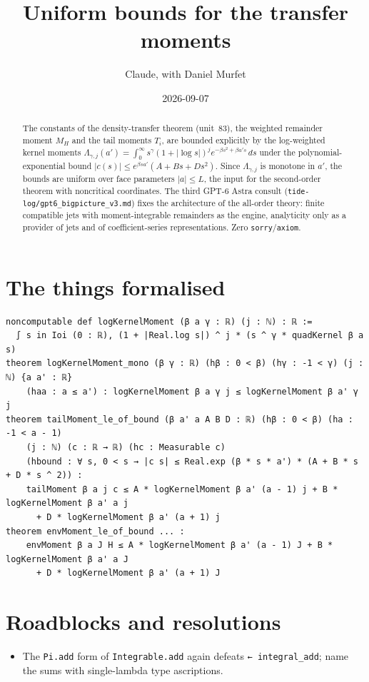 \documentclass[11pt]{article}
\title{Uniform bounds for the transfer moments}
\author{Claude, with Daniel Murfet}
\date{2026-09-07}
\begin{document}
\maketitle
\sloppy

\begin{abstract}
The constants of the density-transfer theorem (unit~83), the weighted remainder moment $M_H$ and the
tail moments $T_i$, are bounded explicitly by the log-weighted kernel moments
$\Lambda_{\gamma,j}(a')=\int_0^\infty s^\gamma(1+|\log s|)^je^{-\beta s^2+\beta a's}\,ds$ under the
polynomial-exponential bound $|c(s)|\le e^{\beta sa'}(A+Bs+Ds^2)$. Since $\Lambda_{\gamma,j}$ is
monotone in $a'$, the bounds are uniform over face parameters $|a|\le L$, the input for the
second-order theorem with noncritical coordinates. The third GPT-6 Astra consult
(\texttt{tide-log/gpt6\_bigpicture\_v3.md}) fixes the architecture of the all-order theory: finite
compatible jets with moment-integrable remainders as the engine, analyticity only as a provider of jets
and of coefficient-series representations. Zero \texttt{sorry}/\texttt{axiom}.
\end{abstract}

\section{The things formalised}
{\small
\begin{verbatim}
noncomputable def logKernelMoment (β a γ : ℝ) (j : ℕ) : ℝ :=
  ∫ s in Ioi (0 : ℝ), (1 + |Real.log s|) ^ j * (s ^ γ * quadKernel β a s)
theorem logKernelMoment_mono (β γ : ℝ) (hβ : 0 < β) (hγ : -1 < γ) (j : ℕ) {a a' : ℝ}
    (haa : a ≤ a') : logKernelMoment β a γ j ≤ logKernelMoment β a' γ j
theorem tailMoment_le_of_bound (β a' a A B D : ℝ) (hβ : 0 < β) (ha : -1 < a - 1)
    (j : ℕ) (c : ℝ → ℝ) (hc : Measurable c)
    (hbound : ∀ s, 0 < s → |c s| ≤ Real.exp (β * s * a') * (A + B * s + D * s ^ 2)) :
    tailMoment β a j c ≤ A * logKernelMoment β a' (a - 1) j + B * logKernelMoment β a' a j
      + D * logKernelMoment β a' (a + 1) j
theorem envMoment_le_of_bound ... :
    envMoment β a J H ≤ A * logKernelMoment β a' (a - 1) J + B * logKernelMoment β a' a J
      + D * logKernelMoment β a' (a + 1) J
\end{verbatim}
}

\section{Roadblocks and resolutions}
\begin{itemize}
\item The \texttt{Pi.add} form of \texttt{Integrable.add} again defeats \texttt{← integral\_add};
name the sums with single-lambda type ascriptions.
\end{itemize}
\end{document}
